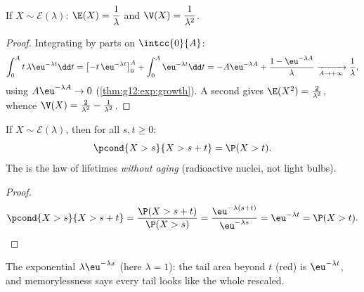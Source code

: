 \begin{proposition}\label{prop:g12:contdist:expomoments}
If $X \sim \mathcal E(\lambda)$:
$\E(X) = \dfrac{1}{\lambda}$ and $\V(X) = \dfrac{1}{\lambda^2}$.
\end{proposition}

\begin{proof}
Integrating by parts on $\intcc{0}{A}$:
\[
\int_0^A t\,\lambda\eu^{-\lambda t}\dd t
= \bigl[-t\,\eu^{-\lambda t}\bigr]_0^A + \int_0^A \eu^{-\lambda t}\dd t
= -A\eu^{-\lambda A} + \frac{1 - \eu^{-\lambda A}}{\lambda}
\xrightarrow[A\to+\infty]{} \frac1\lambda,
\]
using $A\eu^{-\lambda A} \to 0$ (\cref{thm:g12:exp:growth}). A second
 gives $\E(X^2) = \frac{2}{\lambda^2}$, whence
$\V(X) = \frac{2}{\lambda^2} - \frac{1}{\lambda^2}$.
\end{proof}

\begin{theorem}[Memorylessness]\label{thm:g12:contdist:memoryless}
If $X \sim \mathcal E(\lambda)$, then for all $s, t \geq 0$:
\[
\pcond{X > s}{X > s + t} = \P(X > t) .
\]
The  is the law of lifetimes \emph{without aging}
(radioactive nuclei, not light bulbs).
\end{theorem}

\begin{proof}
\[
\pcond{X > s}{X > s+t}
= \frac{\P(X > s + t)}{\P(X > s)}
= \frac{\eu^{-\lambda(s+t)}}{\eu^{-\lambda s}} = \eu^{-\lambda t}
= \P(X > t). \qedhere
\]
\end{proof}

\begin{omfigure}

{\small The exponential  $\lambda\eu^{-\lambda x}$ (here
$\lambda = 1$): the tail area beyond $t$ (red) is $\eu^{-\lambda t}$,
and memorylessness says every tail looks like the whole 
rescaled.}
\end{omfigure}

